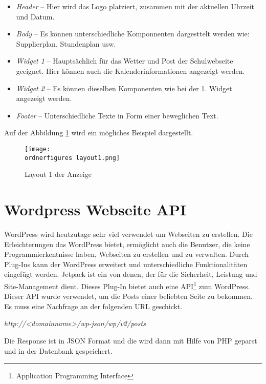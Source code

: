 \begin{itemize}
	\item \textit{Header} – Hier wird das Logo platziert, zusammen mit der aktuellen Uhrzeit und Datum.
	\item \textit{Body} – Es können unterschiedliche Komponnenten dargesttelt werden wie: Supplierplan, Stundenplan usw.
	\item \textit{Widget 1} – Hauptsächlich für das Wetter und Post der Schulwebseite geeignet. Hier können auch die Kalenderinformationen angezeigt werden.
	\item \textit{Widget 2} – Es können dieselben Komponenten wie bei der 1. Widget angezeigt werden.
	\item \textit{Footer} – Unterschiedliche Texte in Form einer beweglichen Text.
	
\end{itemize}

Auf der Abbildung \ref{fi:layout1} wird ein mögliches Beispiel dargestellt.

\begin{figure}[H]
	\centering
	\texttt{[image: \\ordnerfigures layout1.png]}
	\caption{Layout 1 der Anzeige}
	\label{fi:layout1}
\end{figure}


\section{Wordpress Webseite API}


WordPress wird heutzutage sehr viel verwendet um Webseiten zu erstellen. Die Erleichterungen das WordPress bietet, ermöglicht auch die Benutzer, die keine Programmierkentnisse haben, Webseiten zu erstellen und zu verwalten. Durch Plug-Ins kann der WordPress erweitert und unterschiedliche Funktionalitäten eingefügt werden. Jetpack ist ein von denen, der für die Sicherheit, Leistung und Site-Management dient. Dieses Plug-In bietet auch eine API\footnote{Application Programming Interface} zum WordPress. Dieser API wurde verwendet, um die Posts einer beliebten Seite zu bekommen. Es muss eine Nachfrage an der folgenden URL geschickt.


\begin{center}
	\textit{http://\textless{}\textit{domainname}\textgreater{}/wp-json/wp/v2/posts}
	
\end{center}


Die Response ist in JSON Format und die wird dann mit Hilfe von PHP geparst und in der Datenbank gespeichert. 


